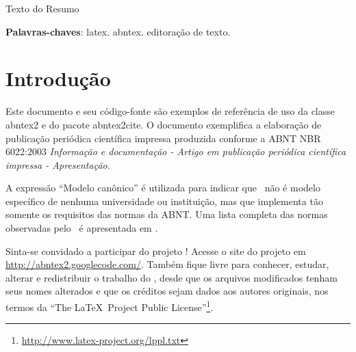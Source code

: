 \documentclass{Article_Class_RevInfor}
\begin{document}


\maketitle
\begin{resumoumacoluna}
Texto do Resumo
 \vspace{\onelineskip}
 
 \noindent
 \textbf{Palavras-chaves}: latex. abntex. editoração de texto.
\end{resumoumacoluna}


\textual

\section*{Introdução}

Este documento e seu código-fonte são exemplos de referência de uso da classe
\textsf{abntex2} e do pacote \textsf{abntex2cite}. O documento exemplifica a
elaboração de publicação periódica científica impressa produzida conforme a ABNT
NBR 6022:2003 \emph{Informação e documentação - Artigo em publicação periódica
científica impressa - Apresentação}.

A expressão ``Modelo canônico'' é utilizada para indicar que \abnTeX\ não é
modelo específico de nenhuma universidade ou instituição, mas que implementa tão
somente os requisitos das normas da ABNT. Uma lista completa das normas
observadas pelo \abnTeX\ é apresentada em .

Sinta-se convidado a participar do projeto \abnTeX! Acesse o site do projeto em
\url{http://abntex2.googlecode.com/}. Também fique livre para conhecer,
estudar, alterar e redistribuir o trabalho do \abnTeX, desde que os arquivos
modificados tenham seus nomes alterados e que os créditos sejam dados aos
autores originais, nos termos da ``The \LaTeX\ Project Public
License''\footnote{\url{http://www.latex-project.org/lppl.txt}}.
\end{document}
